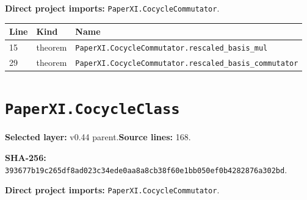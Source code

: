 \documentclass[10pt,oneside]{book}
\begin{document}

\textbf{Direct project imports:} \nolinkurl{PaperXI.CocycleCommutator}.

\begin{longtable}{@{}p{}p{}p{}@{}}\toprule Line&Kind&Name\\\midrule\endhead

15&theorem&\nolinkurl{PaperXI.CocycleCommutator.rescaled_basis_mul}\\

29&theorem&\nolinkurl{PaperXI.CocycleCommutator.rescaled_basis_commutator}\\

\bottomrule\end{longtable}

\section{\texorpdfstring{\nolinkurl{PaperXI.CocycleClass}}{PaperXI.CocycleClass}}\label{module:PaperXI.CocycleClass}

\textbf{Selected layer:} v0.44 parent.\quad\textbf{Source lines:} 168.\par\textbf{SHA-256:} {\scriptsize\nolinkurl{393677b19c265df8ad023c34ede0aa8a8cb38f60e1bb050ef0b4282876a302bd}}.


\textbf{Direct project imports:} \nolinkurl{PaperXI.CocycleCommutator}.
\end{document}
